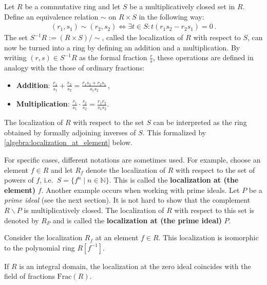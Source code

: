     \begin{construct}[Localization]
        Let $R$ be a commutative ring and let $S$ be a multiplicatively closed set in $R$. Define an equivalence relation $\sim$ on $R\times S$ in the following way:
        \begin{gather}
            (r_1,s_1)\sim(r_2,s_2) \iff \exists t\in S:t(r_1s_2 - r_2s_1) = 0\,.
        \end{gather}
        The set $S^{-1}R:=(R\times S)/\sim$, called the localization of $R$ with respect to $S$, can now be turned into a ring by defining an addition and a multiplication. By writing $(r,s)\in S^{-1}R$ as the formal fraction $\frac{r}{s}$, these operations are defined in analogy with the those of ordinary fractions:
        \begin{itemize}
            \item\textbf{Addition}: $\displaystyle\frac{r_1}{s_1} + \frac{r_2}{s_2} = \frac{r_1s_2 + r_2s_1}{s_1s_2}$\,,
            \item\textbf{Multiplication}: $\displaystyle\frac{r_1}{s_1}\cdot\frac{r_2}{s_2} = \frac{r_1r_2}{s_1s_2}$.
        \end{itemize}
    \end{construct}
    \begin{remark}
        The localization of $R$ with respect to the set $S$ can be interpreted as the ring obtained by formally adjoining inverses of $S$. This formalized by \cref{algebra:localization_at_element} below.
    \end{remark}

    \begin{notation}\label{algebra:localization_notation}
        For specific cases, different notations are sometimes used. For example, choose an element $f\in R$ and let $R_f$ denote the localization of $R$ with respect to the set of powers of $f$, i.e.~$S=\{f^n\mid n\in\mathbb{N}\}$. This is called the \textbf{localization at (the element)} $f$. Another example occurs when working with prime ideals. Let $P$ be a \textit{prime ideal} (see the next section). It is not hard to show that the complement $R\backslash P$ is multiplicatively closed. The localization of $R$ with respect to this set is denoted by $R_P$ and is called the \textbf{localization at (the prime ideal)} $P$.
    \end{notation}

    \begin{property}\label{algebra:localization_at_element}
        Consider the localization $R_f$ at an element $f\in R$. This localization is isomorphic to the polynomial ring $R[f^{-1}]$.
    \end{property}
    \begin{property}
        If $R$ is an integral domain, the localization at the zero ideal coincides with the field of fractions $\mathrm{Frac}(R)$.
    \end{property}

